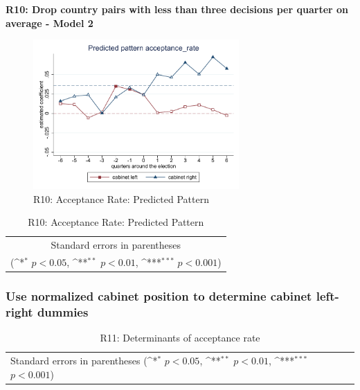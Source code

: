 \documentclass[10pt,a4paper]{scrartcl}
\begin{document}
\clearpage
\textbf{R10: Drop country pairs with less than three decisions per quarter on average - Model 2}
\begin{figure}[!ht]
	\centering
	\includegraphics[width=0.7\textwidth]{figures_edited/acceptance_rate_graph2_R10.pdf}
	\caption{R10: Acceptance Rate: Predicted Pattern}
\end{figure}

\begin{table}[!ht]\centering
	\footnotesize
	\renewcommand{\arraystretch}{1.2}
	\def\sym#1{\ifmmode^{#1}\else\(^{#1}\)\fi}
	\caption{R10: Acceptance Rate: Predicted Pattern}
	\begin{tabular}{l*{2}{c}}
		\hline\hline
		
		\hline\hline
		\multicolumn{3}{c}{\footnotesize Standard errors in parentheses} \\
		\multicolumn{3}{c}{\footnotesize (\sym{*} \(p<0.05\), \sym{**} \(p<0.01\), \sym{***} \(p<0.001\))} \\
	\end{tabular}
\end{table}





\clearpage
\FloatBarrier
\subsubsection{Use normalized cabinet position to determine cabinet left-right dummies}
\begin{table}[!ht]\centering
	\renewcommand{\arraystretch}{1.25}
	\small
	\def\sym#1{\ifmmode^{#1}\else\(^{#1}\)\fi}
	\caption{R11: Determinants of acceptance rate}
	\begin{tabular}{l*{3}{c}}
		\hline\hline
		
		\hline\hline
		\multicolumn{4}{l}{\footnotesize Standard errors in parentheses (\sym{*} \(p<0.05\), \sym{**} \(p<0.01\), \sym{***} \(p<0.001\))}\\
	\end{tabular}
\end{table}
\end{document}
